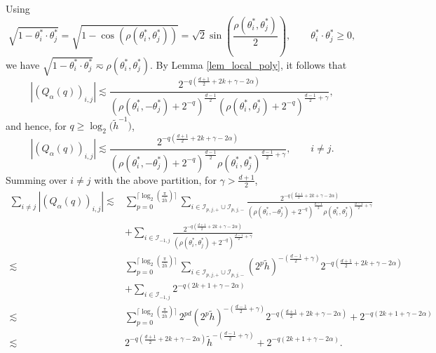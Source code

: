 \documentclass{article}
\numberwithin{equation}{section}
\def\sul{\sum\limits}
\begin{document}
Using
$$\sqrt{1-\theta_i^*\cdot \theta_j^*}=\sqrt{1-\cos(\rho(\theta_i^*,\theta_j^*))}=\sqrt{2}\sin\left(\frac{\rho(\theta_i^*,\theta_j^*)}{2}\right),\qquad \theta_i^*\cdot \theta_j^*\geq0,$$
we have $\sqrt{1-\theta_i^*\cdot \theta_j^*}\eqsim\rho(\theta_i^*,\theta_j^*)$.
By Lemma \ref{lem_local_poly}, it follows that
\begin{equation*}
    \left|\left(Q_{\alpha}(q)\right)_{i,j}\right|\lesssim\frac{2^{-q(\frac{d+1}{2}+2k+\gamma-2\alpha)}}{(\rho(\theta_i^*,-\theta_j^*)+2^{-q})^{\frac{d-1}{2}}(\rho(\theta_i^*,\theta_j^*)+2^{-q})^{\frac{d-1}{2}+\gamma}},
\end{equation*}
and hence, for $q\geq\log_2\big({\tilde h^{-1}}\big)$,
\begin{equation*}
    \left|\left(Q_{\alpha}(q)\right)_{i,j}\right|\lesssim\frac{2^{-q(\frac{d+1}{2}+2k+\gamma-2\alpha)}}{(\rho(\theta_i^*,-\theta_j^*)+2^{-q})^{\frac{d-1}{2}}\rho(\theta_i^*,\theta_j^*)^{\frac{d-1}{2}+\gamma}},\qquad i\neq j.
\end{equation*}
Summing over $i\ne j$ with the above partition, for $\gamma>\frac{d+1}{2}$,
\begin{equation}\label{eqn_Q_ij_sum}
    \begin{split}
        \sul_{i\neq j}\left|\left(Q_{\alpha}(q)\right)_{i,j}\right|
        \lesssim& \sul_{p=0}^{\lceil\log_2\left(\frac{\pi}{2\tilde h}\right)\rceil}\sul_{i\in\mathcal{I}_{p,j,+}\cup\mathcal{I}_{p,j,-}}\frac{2^{-q(\frac{d+1}{2}+2k+\gamma-2\alpha)}}{(\rho(\theta_i^*,-\theta_j^*)+2^{-q})^{\frac{d-1}{2}}\rho(\theta_i^*,\theta_j^*)^{\frac{d-1}{2}+\gamma}}\\
        &+\sul_{i\in\mathcal{I}_{-1,j}}\frac{2^{-q(\frac{d+1}{2}+2k+\gamma-2\alpha)}}{(\rho(\theta_i^*,\theta_j^*)+2^{-q})^{\frac{d-1}{2}+\gamma}}\\
        \lesssim&\sul_{p=0}^{\lceil\log_2\left(\frac{\pi}{2\tilde h}\right)\rceil}\sul_{i\in\mathcal{I}_{p,j,+}\cup\mathcal{I}_{p,j,-}}(2^p\tilde h)^{-\left(\frac{d-1}{2}+\gamma\right)}2^{-q(\frac{d+1}{2}+2k+\gamma-2\alpha)}\\
        &+\sul_{i\in\mathcal{I}_{-1,j}}2^{-q(2k+1+\gamma-2\alpha)}\\
        \lesssim&\sul_{p=0}^{\lceil\log_2\left(\frac{\pi}{2\tilde h}\right)\rceil}2^{pd}(2^p\tilde h)^{-\left(\frac{d-1}{2}+\gamma\right)}2^{-q(\frac{d+1}{2}+2k+\gamma-2\alpha)}+2^{-q(2k+1+\gamma-2\alpha)}\\
        \lesssim&2^{-q(\frac{d+1}{2}+2k+\gamma-2\alpha)}\tilde h^{-(\frac{d-1}{2}+\gamma)}+2^{-q(2k+1+\gamma-2\alpha)}.
    \end{split}
\end{equation}
\end{document}
